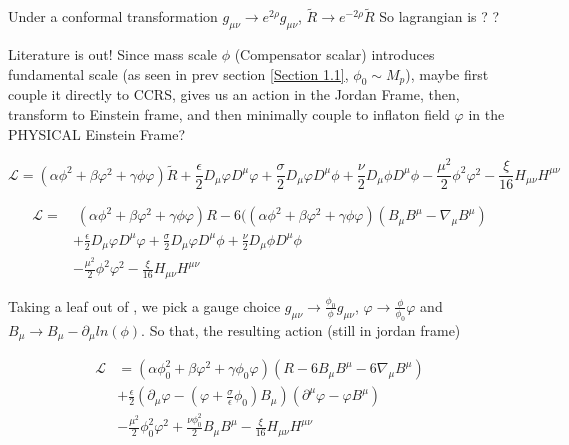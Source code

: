 \documentclass{article}
\begin{document}
Under a conformal transformation $g_{\mu\nu} \rightarrow e^{2\rho}g_{\mu\nu}$, $\tilde{R} \rightarrow e^{-2\rho} \tilde{R}$
So lagrangian is ? ? 

Literature is out! Since mass scale $\phi$ (Compensator scalar) introduces fundamental scale (as seen in prev section \ref{Section 1.1}, $\phi_0 \sim M_p$), maybe first couple it directly to CCRS, gives us an action in the Jordan Frame, then, transform to Einstein frame, and then minimally couple to inflaton field $\varphi$ in the PHYSICAL Einstein Frame?

\begin{equation}
    \mathcal{L} = (\alpha \phi^2 + \beta \varphi^2 + \gamma \phi \varphi) \tilde{R} + \frac{\epsilon}{2} D_{\mu}\varphi D^{\mu}\varphi + \frac{\sigma}{2} D_{\mu}\varphi D^{\mu}\phi  +  \frac{\nu}{2} D_{\mu}\phi D^{\mu}\phi - \frac{\mu^2}{2} \phi^2 \varphi^2 - \frac{\xi}{16} H_{\mu\nu}H^{\mu\nu}
\end{equation}

\begin{equation}
    \begin{aligned}
        \mathcal{L} = &\; (\alpha \phi^2 + \beta \varphi^2 + \gamma \phi \varphi)R - 6((\alpha \phi^2 + \beta \varphi^2 + \gamma \phi \varphi)(B_{\mu} B^{\mu} - \nabla_\mu B^\mu) \\
        & +\frac{\epsilon}{2} D_{\mu}\varphi D^{\mu}\varphi + \frac{\sigma}{2} D_{\mu}\varphi D^{\mu}\phi + \frac{\nu}{2} D_{\mu}\phi D^{\mu}\phi \\
        & - \frac{\mu^2}{2} \phi^2 \varphi^2 - \frac{\xi}{16} H_{\mu\nu}H^{\mu\nu}
    \end{aligned}
\end{equation}


Taking a leaf out of \cite{barker2024poincaregaugetheoryconformal}, we pick a gauge choice $g_{\mu \nu} \rightarrow \frac{\phi_0}{\phi} g_{\mu \nu}$, $\varphi \rightarrow \frac{\phi}{\phi_0} \varphi$ and $B_{\mu} \rightarrow B_{\mu} - \partial_{\mu} ln(\phi)$. So that, the resulting action (still in jordan frame)

\begin{equation}
    \begin{aligned}
        \mathcal{L} &= (\alpha \phi^2_0 + \beta \varphi^2 + \gamma \phi_0 \varphi) (R - 6B_{\mu} B^{\mu} - 6\nabla_\mu B^\mu) \\
        &+ \frac{\epsilon}{2} (\partial_\mu \varphi - (\varphi + \frac{\sigma}{\epsilon} \phi_0)B_\mu)(\partial^\mu \varphi - \varphi B^\mu)\\
        &- \frac{\mu^2}{2} \phi^2_0 \varphi^2 + \frac{\nu \phi_{0}^{2}}{2} B_\mu B^\mu - \frac{\xi}{16} H_{\mu\nu}H^{\mu\nu}
    \end{aligned}
\end{equation}
\end{document}

